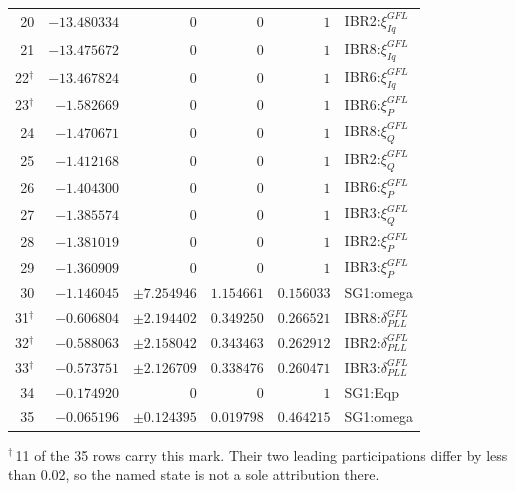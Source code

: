 \begin{longtable}{@{}r r r r r l@{}}
20 & $-13.480334$ & $0$ & $0$ & $1$ & IBR2:$\xi_{Iq}^{GFL}$ \\ 
21 & $-13.475672$ & $0$ & $0$ & $1$ & IBR8:$\xi_{Iq}^{GFL}$ \\ 
22$^{\dagger}$ & $-13.467824$ & $0$ & $0$ & $1$ & IBR6:$\xi_{Iq}^{GFL}$ \\ 
23$^{\dagger}$ & $-1.582669$ & $0$ & $0$ & $1$ & IBR6:$\xi_{P}^{GFL}$ \\ 
24 & $-1.470671$ & $0$ & $0$ & $1$ & IBR8:$\xi_{Q}^{GFL}$ \\ 
25 & $-1.412168$ & $0$ & $0$ & $1$ & IBR2:$\xi_{Q}^{GFL}$ \\ 
26 & $-1.404300$ & $0$ & $0$ & $1$ & IBR6:$\xi_{P}^{GFL}$ \\ 
27 & $-1.385574$ & $0$ & $0$ & $1$ & IBR3:$\xi_{Q}^{GFL}$ \\ 
28 & $-1.381019$ & $0$ & $0$ & $1$ & IBR2:$\xi_{P}^{GFL}$ \\ 
29 & $-1.360909$ & $0$ & $0$ & $1$ & IBR3:$\xi_{P}^{GFL}$ \\ 
30 & $-1.146045$ & $\pm7.254946$ & $1.154661$ & $0.156033$ & SG1:omega \\ 
31$^{\dagger}$ & $-0.606804$ & $\pm2.194402$ & $0.349250$ & $0.266521$ & IBR8:$\delta_{PLL}^{GFL}$ \\ 
32$^{\dagger}$ & $-0.588063$ & $\pm2.158042$ & $0.343463$ & $0.262912$ & IBR2:$\delta_{PLL}^{GFL}$ \\ 
33$^{\dagger}$ & $-0.573751$ & $\pm2.126709$ & $0.338476$ & $0.260471$ & IBR3:$\delta_{PLL}^{GFL}$ \\ 
34 & $-0.174920$ & $0$ & $0$ & $1$ & SG1:Eqp \\ 
35 & $-0.065196$ & $\pm0.124395$ & $0.019798$ & $0.464215$ & SG1:omega \\ 
\bottomrule
\end{longtable}
\noindent$^{\dagger}$\,11 of the 35 rows carry this mark. Their two leading participations differ by less than 0.02, so the named state is not a sole attribution there.\par
\endgroup
